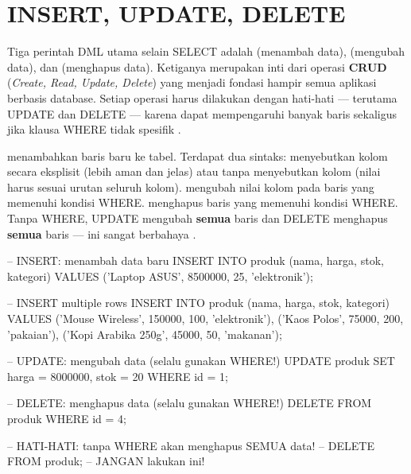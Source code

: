 ﻿\section{INSERT, UPDATE, DELETE}

Tiga perintah DML utama selain SELECT adalah  (menambah data),  (mengubah data), dan  (menghapus data). Ketiganya merupakan inti dari operasi \textbf{CRUD} (\textit{Create, Read, Update, Delete}) yang menjadi fondasi hampir semua aplikasi berbasis database. Setiap operasi harus dilakukan dengan hati-hati --- terutama UPDATE dan DELETE --- karena dapat mempengaruhi banyak baris sekaligus jika klausa WHERE tidak spesifik \cite{mysqlDocs}.

 menambahkan baris baru ke tabel. Terdapat dua sintaks: menyebutkan kolom secara eksplisit (lebih aman dan jelas) atau tanpa menyebutkan kolom (nilai harus sesuai urutan seluruh kolom).  mengubah nilai kolom pada baris yang memenuhi kondisi WHERE.  menghapus baris yang memenuhi kondisi WHERE. Tanpa WHERE, UPDATE mengubah \textbf{semua} baris dan DELETE menghapus \textbf{semua} baris --- ini sangat berbahaya \cite{mysqlGettingStarted}.

\begin{webcode}[language=SQL, caption={INSERT, UPDATE, dan DELETE}]
-- INSERT: menambah data baru
INSERT INTO produk (nama, harga, stok, kategori)
  VALUES ('Laptop ASUS', 8500000, 25, 'elektronik');

-- INSERT multiple rows
INSERT INTO produk (nama, harga, stok, kategori) VALUES
  ('Mouse Wireless', 150000, 100, 'elektronik'),
  ('Kaos Polos', 75000, 200, 'pakaian'),
  ('Kopi Arabika 250g', 45000, 50, 'makanan');

-- UPDATE: mengubah data (selalu gunakan WHERE!)
UPDATE produk SET harga = 8000000, stok = 20
  WHERE id = 1;

-- DELETE: menghapus data (selalu gunakan WHERE!)
DELETE FROM produk WHERE id = 4;

-- HATI-HATI: tanpa WHERE akan menghapus SEMUA data!
-- DELETE FROM produk;  -- JANGAN lakukan ini!
\end{webcode}

